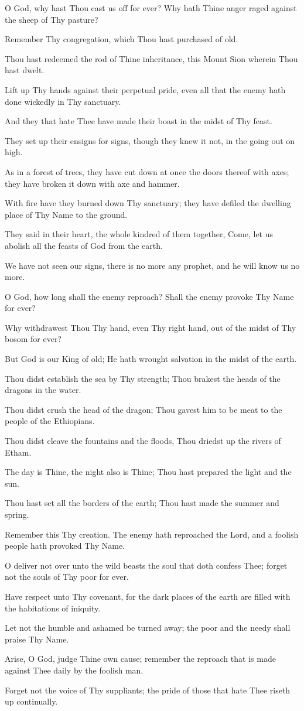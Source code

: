 O God, why hast Thou cast us off for ever? Why hath Thine anger raged against the sheep of Thy pasture?

Remember Thy congregation, which Thou hast purchased of old.

Thou hast redeemed the rod of Thine inheritance, this Mount Sion wherein Thou hast dwelt.

Lift up Thy hands against their perpetual pride, even all that the enemy hath done wickedly in Thy sanctuary.

And they that hate Thee have made their boast in the midst of Thy feast.

They set up their ensigns for signs, though they knew it not, in the going out on high.

As in a forest of trees, they have cut down at once the doors thereof with axes; they have broken it down with axe and hammer.

With fire have they burned down Thy sanctuary; they have defiled the dwelling place of Thy Name to the ground.

They said in their heart, the whole kindred of them together, Come, let us abolish all the feasts of God from the earth.

We have not seen our signs, there is no more any prophet, and he will know us no more.

O God, how long shall the enemy reproach? Shall the enemy provoke Thy Name for ever?

Why withdrawest Thou Thy hand, even Thy right hand, out of the midst of Thy bosom for ever?

But God is our King of old; He hath wrought salvation in the midst of the earth.

Thou didst establish the sea by Thy strength; Thou brakest the heads of the dragons in the water.

Thou didst crush the head of the dragon; Thou gavest him to be meat to the people of the Ethiopians.

Thou didst cleave the fountains and the floods, Thou driedst up the rivers of Etham.

The day is Thine, the night also is Thine; Thou hast prepared the light and the sun.

Thou hast set all the borders of the earth; Thou hast made the summer and spring.

Remember this Thy creation. The enemy hath reproached the Lord, and a foolish people hath provoked Thy Name.

O deliver not over unto the wild beasts the soul that doth confess Thee; forget not the souls of Thy poor for ever.

Have respect unto Thy covenant, for the dark places of the earth are filled with the habitations of iniquity.

Let not the humble and ashamed be turned away; the poor and the needy shall praise Thy Name.

Arise, O God, judge Thine own cause; remember the reproach that is made against Thee daily by the foolish man.

Forget not the voice of Thy suppliants; the pride of those that hate Thee riseth up continually.
